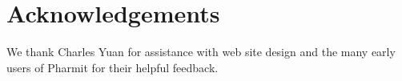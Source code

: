 \section{Acknowledgements}

We thank Charles Yuan for assistance with web site design and the many early users of Pharmit for their helpful feedback.
